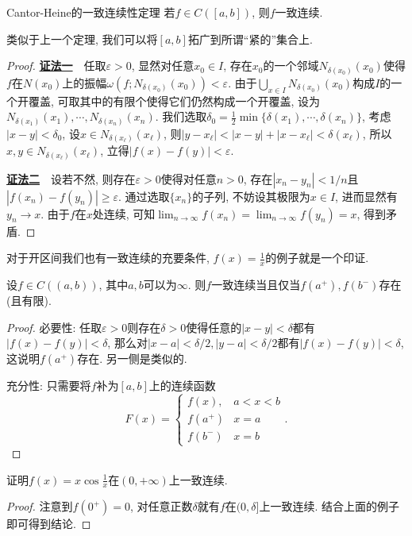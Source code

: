 \begin{theorem}{Cantor-Heine的一致连续性定理}
	若$f \in C([a,b])$, 则$f$一致连续. 
\end{theorem}
\begin{remark}
	类似于上一个定理, 我们可以将$[a,b]$拓广到所谓“紧的”集合上. 
\end{remark}
\begin{proof}
	\underline{\textbf{证法一}}~~任取$\varepsilon >0$, 显然对任意$x_0 \in I$, 存在$x_0$的一个邻域$N_{\delta(x_0)}(x_0)$使得$f$在$N(x_0)$上的振幅$\omega (f;N_{\delta(x_0)}(x_0)) <\varepsilon$. 由于$\bigcup_{x \in I} N_{\delta(x_0)}(x_0)$构成$I$的一个开覆盖, 可取其中的有限个使得它们仍然构成一个开覆盖, 设为$N_{\delta (x_1)}(x_1), \cdots ,N_{\delta (x_n)}(x_n)$. 我们选取$\delta _0 = \frac{1}{2}\min \{ \delta (x_1),\cdots ,\delta (x_n) \}$, 考虑$|x-y|<\delta _0$, 设$x \in N_{\delta (x_{\ell})}(x_{\ell})$, 则$|y-x_{\ell}| < |x-y|+|x-x_{\ell}|<\delta (x_{\ell})$, 所以$x,y \in N_{\delta (x_{\ell})}(x_{\ell})$, 立得$|f(x)-f(y)|<\varepsilon$. 
	
	\underline{\textbf{证法二}}~~设若不然, 则存在$\varepsilon >0$使得对任意$n >0$, 存在$|x_n-y_n|<1/n$且$|f(x_n)-f(y_n)| \geq \varepsilon$. 通过选取$\{ x_n \}$的子列, 不妨设其极限为$x \in I$, 进而显然有$y_n \to x$. 由于$f$在$x$处连续, 可知$\lim_{n\to \infty} f(x_n) = \lim_{n\to \infty} f(y_n) = x$, 得到矛盾. 
\end{proof}

对于开区间我们也有一致连续的充要条件, $f(x)=\frac{1}{x}$的例子就是一个印证. 

\begin{proposition}{} \label{pro:kdqujmuhyivilmxu}
	设$f \in C((a,b))$, 其中$a,b$可以为$\infty$. 则$f$一致连续当且仅当$f(a^+),f(b^-)$存在(且有限). 
\end{proposition}
\begin{proof}
	必要性: 任取$\varepsilon >0$则存在$\delta >0$使得任意的$|x-y|<\delta$都有$|f(x)-f(y)|<\delta$, 那么对$|x-a|<\delta /2, |y-a|<\delta /2$都有$|f(x)-f(y)|<\delta$, 这说明$f(a^+)$存在. 另一侧是类似的. 
	
	充分性: 只需要将$f$补为$[a,b]$上的连续函数$$F(x)=\begin{cases}
 f(x), & a<x<b \\
 f(a^+) & x=a \\
 f(b^-) & x=b
\end{cases}.$$
\end{proof}

\begin{example}
	证明$f(x)=x\cos \frac{1}{x}$在$(0,+\infty)$上一致连续. 
\end{example}
\begin{proof}
	注意到$f(0^+)=0$, 对任意正数$\delta$就有$f$在$(0,\delta ]$上一致连续. 结合上面的例子即可得到结论. 
\end{proof}

